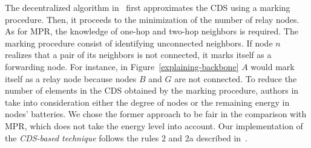 The decentralized algorithm in~\cite{Wu2001} first approximates the CDS using a marking procedure.
Then, it proceeds to the minimization of the number of relay nodes.
%
As for MPR, the knowledge of one-hop and two-hop neighbors is required. 
%
The marking procedure consist of identifying unconnected neighbors.
If node $n$ realizes that a pair of its neighbors is not connected, it marks itself as a forwarding node.
%
For instance, in Figure~\ref{explaining-backbone} $A$ would mark itself as a relay node because nodes $B$ and $G$ are not connected.
%
To reduce the number of elements in the CDS obtained by the marking procedure, authors in~\cite{Wu2001} take into consideration either the degree of nodes or the remaining energy in nodes' batteries.
%
We chose the former approach to be fair in the comparison with MPR, which does not take the energy level into account.
%
Our implementation of the \emph{CDS-based technique} follows the rules 2 and 2a described in~\cite{Wu2001}.


%

